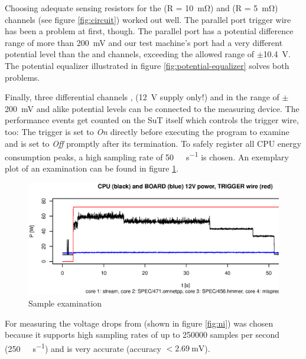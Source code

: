 Choosing adequate sensing resistors for the  (R =
\SI{10}{\milli\ohm}) and  (R = \SI{5}{\milli\ohm}) channels (see
figure \ref{fig:circuit}) worked out well. The parallel port trigger wire has
been a problem at first, though. The parallel port has a potential difference
range of more than \SI{200}{\milli\volt} and our test machine's port had a very
different potential level than the  and  channels,
exceeding the allowed range of $\pm$\SI{10.4}{\volt}.  The potential equalizer
illustrated in figure \ref{fig:potential-equalizer} solves both problems.

Finally, three differential channels , 
(\SI{12}{\volt} supply only!) and  in the range of
$\pm$\SI{200}{\milli\volt} and alike potential levels can be connected to the
measuring device. The performance events get counted on the SuT itself which
controls the trigger wire, too: The trigger is set to \emph{On} directly before
executing the program to examine and is set to \emph{Off} promptly after its
termination. To safely register all CPU energy consumption peaks, a high
sampling rate of \SI{50}{\kilo\samples\per\second} is chosen. An exemplary
plot of an examination can be found in figure \ref{fig:cpu-power-trig}.

\begin{figure}
  \centering
    \includegraphics[width=\textwidth]{fig/cpu-power-trig.eps}
  \caption{Sample examination}
  \label{fig:cpu-power-trig}
\end{figure}


\label{sec:measuring-device}

For measuring the voltage drops \JWPLni{} from
 (shown in figure
\ref{fig:ni}) was chosen because it supports high sampling rates of up to 250000
samples per second (\SI{250}{\kilo\samples\per\second}) and is very accurate
(accuracy $< \SI{2.69}{\milli\volt}$)\cite{NISpec2009}.

